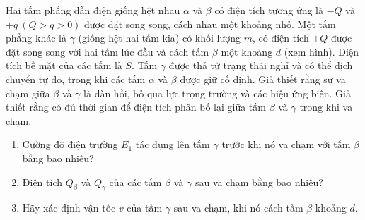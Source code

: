     \begin{vd}
 Hai tấm phẳng dẫn điện giống hệt nhau $\alpha$ và $\beta$ có điện tích tương ứng là $-Q$ và $+q~(Q>q>0)$ được đặt song song, cách nhau một khoảng nhỏ. Một tấm phẳng khác là $\gamma$ (giống hệt hai tấm kia) có khối lượng $m$, có điện tích $+Q$ được đặt song song với hai tấm lúc đầu và cách tấm $\beta$ một khoảng $d$ (xem hình). Diện tích bề mặt của các tấm là $S$. Tấm $\gamma$ được thả từ trạng thái nghỉ và có thể dịch chuyển tự do, trong khi các tấm $\alpha$ và $\beta$ được giữ cố định. Giả thiết rằng sự va chạm giữa $\beta$ và $\gamma$ là đàn hồi, bỏ qua lực trọng trường và các hiệu ứng biên. Giả thiết rằng có đủ thời gian để điện tích phân bố lại giữa tấm $\beta$ và $\gamma$ trong khi va chạm.
 \begin{enumerate}[1)]
\item Cường độ điện trường $E_{1}$ tác dụng lên tấm $\gamma$ trước khi nó va chạm với tấm $\beta$ bằng bao nhiêu?
\item Điện tích $Q_{\beta}$ và $Q_{\gamma}$ của các tấm $\beta$ và $\gamma$ sau va chạm bằng bao nhiêu?
\item Hãy xác định vận tốc ${v}$ của tấm $\gamma$ sau va chạm, khi nó cách tấm $\beta$ khoảng $d$.
\begin{center}

\end{center}
\end{enumerate}
\end{vd}
